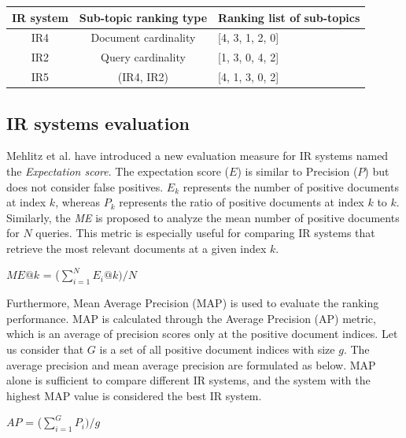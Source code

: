  
 
 \begin{center}
 	\label{tab:ir5_result}
 	\begin{tabularx}{0.8\textwidth}{|c|c|Y|}
 		\hline

 			IR system & Sub-topic ranking type & Ranking list of sub-topics \\
 		\hline
 		IR4 & Document cardinality  & [4, 3, 1, 2, 0] \\
 		\hline
 		IR2 & Query cardinality  & [1, 3, 0, 4, 2] \\
 		\hline
 		IR5 & (IR4, IR2) & [4, 1, 3, 0, 2] \\
 		\hline
 	\end{tabularx}
 \end{center}
 

\subsection{IR systems evaluation}

Mehlitz et al. \cite{mehlitz2007new} have introduced a new evaluation measure for \ac{IR} systems named the \textit{Expectation score}. The expectation score ($E$) is similar to Precision ($P$) but does not consider false positives. $E_k$ represents the number of positive documents at index $k$, whereas $P_k$ represents the ratio of positive documents at index $k$ to $k$. Similarly, the \textit{\ac{ME}} is proposed to analyze the mean number of positive documents for $N$ queries. This metric is especially useful for comparing \ac{IR} systems that retrieve the most relevant documents at a given index $k$.



\centerline{$ME@k$ = ($\sum\limits_{i=1}^N E_i@k) /N$}

Furthermore, Mean Average Precision (MAP) \cite{cormack2006statistical} is used to evaluate the ranking performance. MAP is calculated through the Average Precision (AP) metric, which is an average of precision scores only at the positive document indices. Let us consider that $G$ is a set of all positive document indices with size $g$. The average precision and mean average precision are formulated as below. MAP alone is sufficient to compare different \ac{IR} systems, and the system with the highest MAP value is considered the best \ac{IR} system.


\centerline{$AP$ = ($\sum\limits_{i=1}^G P_i) /g$}

